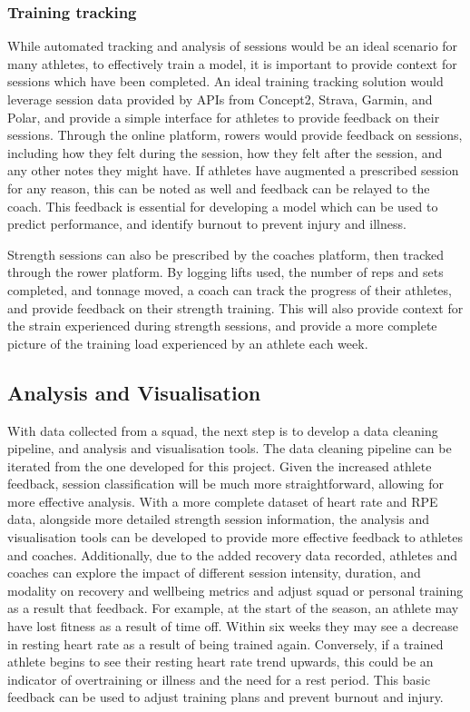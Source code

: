 \subsubsection{Training tracking}
While automated tracking and analysis of sessions would be an ideal scenario for many athletes, to effectively train a model, it is important to provide context for sessions which have been completed. An ideal training tracking solution would leverage session data provided by APIs from Concept2, Strava, Garmin, and Polar, and provide a simple interface for athletes to provide feedback on their sessions. Through the online platform, rowers would provide feedback on sessions, including how they felt during the session, how they felt after the session, and any other notes they might have. If athletes have augmented a prescribed session for any reason, this can be noted as well and feedback can be relayed to the coach. This feedback is essential for developing a model which can be used to predict performance, and identify burnout to prevent injury and illness.

Strength sessions can also be prescribed by the coaches platform, then tracked through the rower platform. By logging lifts used, the number of reps and sets completed, and tonnage moved, a coach can track the progress of their athletes, and provide feedback on their strength training. This will also provide context for the strain experienced during strength sessions, and provide a more complete picture of the training load experienced by an athlete each week.

\subsection{Analysis and Visualisation}
With data collected from a squad, the next step is to develop a data cleaning pipeline, and analysis and visualisation tools. The data cleaning pipeline can be iterated from the one developed for this project. Given the increased athlete feedback, session classification will be much more straightforward, allowing for more effective analysis. With a more complete dataset of heart rate and RPE data, alongside more detailed strength session information, the analysis and visualisation tools can be developed to provide more effective feedback to athletes and coaches. Additionally, due to the added recovery data recorded, athletes and coaches can explore the impact of different session intensity, duration, and modality on recovery and wellbeing metrics and adjust squad or personal training as a result that feedback. For example, at the start of the season, an athlete may have lost fitness as a result of time off. Within six weeks they may see a decrease in resting heart rate as a result of being trained again. Conversely, if a trained athlete begins to see their resting heart rate trend upwards, this could be an indicator of overtraining or illness and the need for a rest period. This basic feedback can be used to adjust training plans and prevent burnout and injury.

